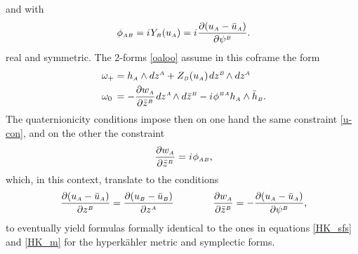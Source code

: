 \documentclass[11pt]{amsart}
\theoremstyle{remark}
\theoremstyle{remark}
\theoremstyle{definition}
\theoremstyle{definition}
\theoremstyle{definition}
\newcommand{\0}{{\scriptstyle 0'}} %
\newcommand{\1}{{\scriptstyle 1'}}
\newcommand{\A}{{\scriptscriptstyle A}} %
\newcommand{\B}{{\scriptscriptstyle B}}
\newcommand{\pt}{\hspace{1pt}} %
\newcommand{\hp}{\hspace{0.5pt}} %
\newcommand{\npt}{\hspace{-1pt}} %
\begin{document}
and with
\begin{equation} \label{phi_AB_2}
\phi_{\A\B} = i \hp Y_{\B}(u_{\A}) = i \hp \frac{\partial (u_{\A} - \bar{u}_{\A})}{\partial \psi^{\B}} \rlap{.}
\end{equation}
real and symmetric. The 2-forms \eqref{oaloo} assume in this coframe the form
\begin{equation}
\begin{aligned}
\omega_+ & = h_{\A} \wedge dz^{\A} + Z_{\B}(u_{\A})\pt dz^{\B} \npt \wedge dz^{\A} \\
\omega_0 \hspace{2pt} & =  - \frac{\partial w_{\A}}{\partial \bar{z}^{\B}} \hp dz^{\A} \npt \wedge d\bar{z}^{\B} - i \hp \phi^{\B\A} h_{\A} \wedge \bar{h}_{\B} \rlap{.}
\end{aligned}
\end{equation}
The quaternionicity conditions impose then on one hand the same constraint \eqref{u-con}, and on the other the constraint
\begin{equation}
\frac{\partial w_{\A}}{\partial \bar{z}^{\B}} = i \hp \phi_{\A\B} \rlap{,}
\end{equation}
which, in this context, translate to the conditions
\begin{equation} \label{quatern-con}
\frac{\partial (u_{\A} - \bar{u}_{\A})}{\partial z^{\B}} =  \frac{\partial (u_{\B} - \bar{u}_{\B})}{\partial z^{\A}}
\qquad\qquad
\frac{\partial w_{\A}}{\partial \bar{z}^{\B}} = - \frac{\partial (u_{\A} - \bar{u}_{\A})}{\partial \psi^{\B}} \rlap{,}
\end{equation}
to eventually yield formulas formally identical to the ones in equations \eqref{HK_sfs} and \eqref{HK_m} for the hyperk\"ahler metric and symplectic forms.
\end{document}
